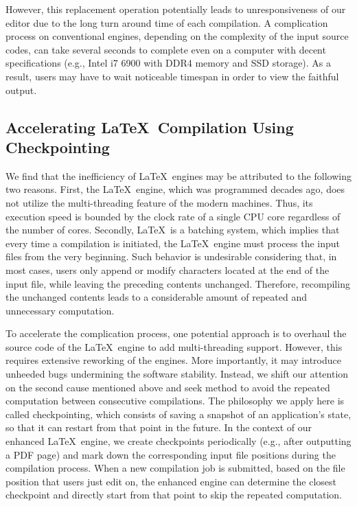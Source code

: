 \documentclass[]{sigchi}
\begin{document}
However, this replacement operation potentially leads to unresponsiveness of our editor due to the long turn around time of each compilation.
 A complication process on conventional engines, depending on the complexity of the input source codes, can take several seconds to complete even on a computer with decent specifications (e.g., Intel i7 6900 with DDR4 memory and SSD storage). As a result, users may have to wait noticeable timespan in order to view the faithful output.

\subsection{Accelerating \LaTeX\ Compilation Using Checkpointing}
We find that the inefficiency of \LaTeX\ engines may be attributed to the following two reasons.
First, the \LaTeX\ engine, which was programmed decades ago, does not utilize the multi-threading feature of the modern machines. Thus, its execution speed is bounded by the clock rate of a single CPU core regardless of the number of cores.
Secondly, \LaTeX\ is a batching system, which implies that every time a compilation is initiated, the \LaTeX\ engine must process the input files from the very beginning. Such behavior is undesirable considering that, in most cases, users only append or modify characters located at the end of the input file, while leaving the preceding contents unchanged. Therefore, recompiling the unchanged contents leads to a considerable amount of repeated and unnecessary computation. 

To accelerate the complication process, one potential approach is to overhaul the source code of the \LaTeX\ engine to add multi-threading support. However, this requires extensive  reworking of the engines. More importantly, it may introduce unheeded bugs undermining the software stability.
Instead, we shift our attention on the second cause mentioned above and seek method to avoid the repeated computation between consecutive compilations.
The philosophy we apply here is called checkpointing, which consists of saving a snapshot of an application's state, so that it can restart from that point in the future. In the context of our enhanced \LaTeX\ engine, we create checkpoints periodically (e.g., after outputting a PDF page) and mark down the corresponding input file positions during the compilation process. When a new compilation job is submitted, based on the file position that users just edit on, the enhanced engine can determine the closest checkpoint and directly start from that point to skip the repeated computation.
\end{document}

